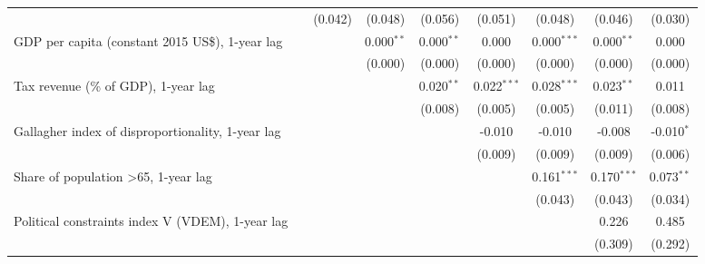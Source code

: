 \begin{table}[htbp]
\begin{tabular}{lcccccccc}
                                                                                &                & (0.042)       & (0.048)       & (0.056)       & (0.051)       & (0.048)        & (0.046)       & (0.030)\\   
      GDP per capita (constant 2015 US\$), 1-year lag                           &                &               & 0.000$^{**}$  & 0.000$^{**}$  & 0.000         & 0.000$^{***}$  & 0.000$^{**}$  & 0.000\\   
                                                                                &                &               & (0.000)       & (0.000)       & (0.000)       & (0.000)        & (0.000)       & (0.000)\\   
      Tax revenue (\% of GDP), 1-year lag                                       &                &               &               & 0.020$^{**}$  & 0.022$^{***}$ & 0.028$^{***}$  & 0.023$^{**}$  & 0.011\\   
                                                                                &                &               &               & (0.008)       & (0.005)       & (0.005)        & (0.011)       & (0.008)\\   
      Gallagher index of disproportionality, 1-year lag                         &                &               &               &               & -0.010        & -0.010         & -0.008        & -0.010$^{*}$\\   
                                                                                &                &               &               &               & (0.009)       & (0.009)        & (0.009)       & (0.006)\\   
      Share of population >65, 1-year lag                                       &                &               &               &               &               & 0.161$^{***}$  & 0.170$^{***}$ & 0.073$^{**}$\\   
                                                                                &                &               &               &               &               & (0.043)        & (0.043)       & (0.034)\\   
      Political constraints index V (VDEM), 1-year lag                          &                &               &               &               &               &                & 0.226         & 0.485\\   
                                                                                &                &               &               &               &               &                & (0.309)       & (0.292)\\   

\end{tabular}
\end{table}
